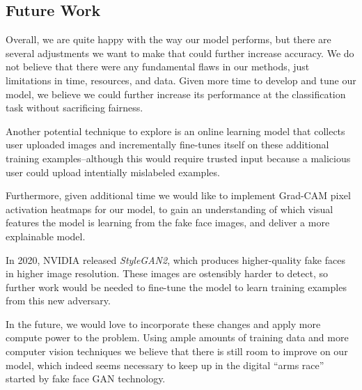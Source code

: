 \documentclass[11pt, letterpaper]{article}
\begin{document}
\begin{multicols}{2}
  \subsection{Future Work}
  Overall, we are quite happy with the way our model performs, but
  there are several adjustments we want to make that could further
  increase accuracy. We do not believe that there were any fundamental
  flaws in our methods, just limitations in time, resources, and
  data. Given more time to develop and tune our model, we believe we
  could further increase its performance at the classification task
  without sacrificing fairness.

  Another potential technique to explore is an online learning model that
  collects user uploaded images and incrementally fine-tunes itself on these
  additional training examples--although this would require trusted input
  because a malicious user could upload intentially mislabeled examples.

  Furthermore, given additional time we would like to implement
  Grad-CAM\cite{Selvaraju_2019} pixel activation heatmaps for our
  model, to gain an understanding of which visual features the model
  is learning from the fake face images, and deliver a more
  explainable model.

  In 2020, NVIDIA released \emph{StyleGAN2}\cite{karras2020analyzing},
  which produces higher-quality fake faces in higher image resolution.
  These images are ostensibly harder to detect, so further work would
  be needed to fine-tune the model to learn training examples from
  this new adversary.

  In the future, we would love to incorporate these changes and apply
  more compute power to the problem. Using ample amounts of training
  data and more computer vision techniques we believe that there is
  still room to improve on our model, which indeed seems necessary to
  keep up in the digital ``arms race'' started by fake face GAN
  technology.

\end{multicols}



\end{document}
